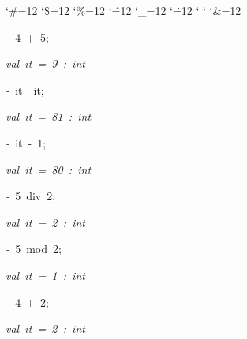 \begin{list}{}
{\setlength{\leftmargin}{\leftmargini}
\setlength{\rightmargin}{0cm}
\setlength{\itemindent}{0cm}
\setlength{\listparindent}{0cm}
\setlength{\itemsep}{0cm}
\setlength{\parsep}{0cm}
\setlength{\labelsep}{0cm}
\setlength{\labelwidth}{0cm}
\catcode`\#=12
\catcode`\$=12
\catcode`\%=12
\catcode`\^=12
\catcode`\_=12
\catcode`\.=12
\catcode`
\catcode`
\catcode`\&=12
\ttfamily}
\small
\item[]\textsl{-\ }4\ +\ 5;
\item[]\textsl{val\ it\ =\ 9\ :\ int}
\item[]\textsl{-\ }it\ \ it;
\item[]\textsl{val\ it\ =\ 81\ :\ int}
\item[]\textsl{-\ }it\ -\ 1;
\item[]\textsl{val\ it\ =\ 80\ :\ int}
\item[]\textsl{-\ }5\ div\ 2;
\item[]\textsl{val\ it\ =\ 2\ :\ int}
\item[]\textsl{-\ }5\ mod\ 2;
\item[]\textsl{val\ it\ =\ 1\ :\ int}
\item[]\textsl{-\ }4\ +\ 2;
\item[]\textsl{val\ it\ =\ 2\ :\ int}
\end{list}
